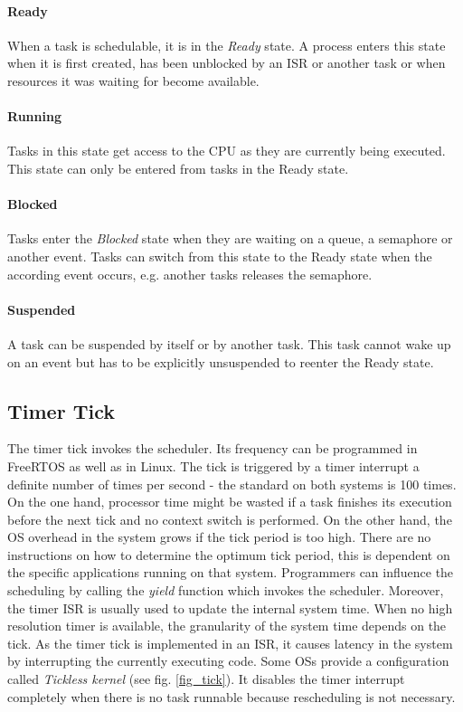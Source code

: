 \paragraph{Ready}
When a task is schedulable, it is in the \textit{Ready} state.  
A process enters this state when it is first created, has been unblocked by an \ac{ISR} or another task or when resources it was waiting for become available.

\paragraph{Running}
Tasks in this state get access to the \ac{CPU} as they are currently being executed.
This state can only be entered from tasks in the Ready state.

\paragraph{Blocked}
Tasks enter the \textit{Blocked} state when they are waiting on a queue, a semaphore or another event.
Tasks can switch from this state to the Ready state when the according event occurs, e.g. another tasks releases the semaphore.

\paragraph{Suspended}
A task can be suspended by itself or by another task. 
This task cannot wake up on an event but has to be explicitly unsuspended to reenter the Ready state.  

\subsection{Timer Tick}\label{ss_timer_tick}
The timer tick invokes the scheduler.
Its frequency can be programmed in FreeRTOS as well as in Linux.
The tick is triggered by a timer interrupt a definite number of times per second - the standard on both systems is 100 times. 
On the one hand, processor time might be wasted if a task finishes its execution before the next tick and no context switch is performed.
On the other hand, the \ac{OS} overhead in the system grows if the tick period is too high.
There are no instructions on how to determine the optimum tick period, this is dependent on the specific applications running on that system. 
Programmers can influence the scheduling by calling the \textit{yield} function which invokes the scheduler.
Moreover, the timer \ac{ISR} is usually used to update the internal system time. 
When no high resolution timer is available, the granularity of the system time depends on the tick.
As the timer tick is implemented in an \ac{ISR}, it causes latency in the system by interrupting the currently executing code. 
Some \acp{OS} provide a configuration called \textit{Tickless kernel} (see fig. \ref{fig_tick}).
It disables the timer interrupt completely when there is no task runnable because rescheduling is not necessary.

